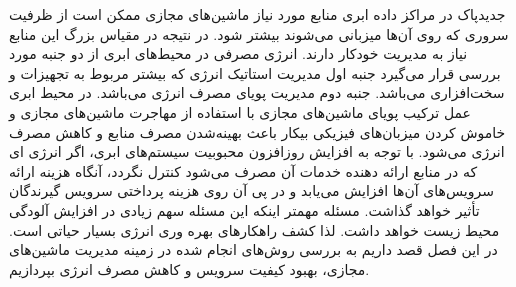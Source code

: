 ‌جدید‌پاک
  در مراکز داده ابری منابع مورد نیاز ماشین‌های مجازی ممکن است از ظرفیت سروری که روی آن‌ها میزبانی می‌شوند بیشتر شود. در نتیجه در مقیاس بزرگ این منابع نیاز به مدیریت خودکار دارند. انرژی مصرفی در محیط‌های ابری از دو جنبه مورد بررسی قرار  می‌گیرد جنبه اول مدیریت استاتیک انرژی که بیشتر مربوط به تجهیزات و سخت‌افزاری می‌باشد. جنبه دوم مدیریت پویای مصرف انرژی می‌باشد. در محیط ابری عمل  ترکیب پویای ماشین‌های مجازی با استفاده از مهاجرت ماشین‌های مجازی و خاموش ­کردن میزبان‌های فیزیکی بیکار باعث 
 بهینه‌شدن  مصرف منابع و کاهش مصرف انرژی می­‌شود­. با توجه به افزایش روزافزون محبوبیت سیستم‌های ابری، اگر انرژی ای که در منابع ارائه دهنده خدمات آن مصرف می‌شود کنترل نگردد، آنگاه هزینه ارائه سرویس‌های آن‌ها  افزایش می‌یابد و در پی آن روی هزینه پرداختی سرویس گیرندگان تأثیر خواهد گذاشت. مسئله مهمتر اینکه این مسئله سهم زیادی در افزایش آلودگی محیط زیست خواهد داشت. لذا کشف راهکارهای بهره وری انرژی بسیار حیاتی است. در این فصل قصد داریم به بررسی روش‌های انجام شده در زمینه مدیریت ماشین‌های مجازی، بهبود کیفیت سرویس و کاهش مصرف انرژی بپردازیم.
 

